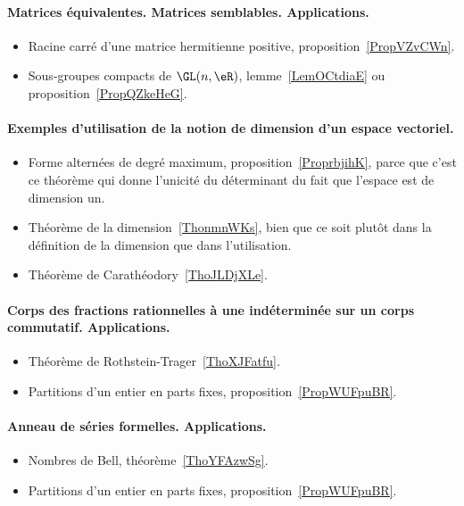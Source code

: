 \paragraph{Matrices équivalentes. Matrices semblables. Applications.}
\begin{itemize}
    \item Racine carré d'une matrice hermitienne positive, proposition~\ref{PropVZvCWn}.
    \item Sous-groupes compacts de \( \GL(n,\eR)\), lemme~\ref{LemOCtdiaE} ou proposition~\ref{PropQZkeHeG}.
\end{itemize}
\paragraph{Exemples d'utilisation de la notion de dimension d'un espace vectoriel.}
\begin{itemize}
    \item Forme alternées de degré maximum, proposition~\ref{ProprbjihK}, parce que c'est ce théorème qui donne l'unicité du déterminant du fait que l'espace est de dimension un.
    \item Théorème de la dimension~\ref{ThonmnWKs}, bien que ce soit plutôt dans la définition de la dimension que dans l'utilisation.
    \item Théorème de Carathéodory~\ref{ThoJLDjXLe}.
\end{itemize}

\paragraph{Corps des fractions rationnelles à une indéterminée sur un corps commutatif. Applications.}
\begin{itemize}
    \item Théorème de Rothstein-Trager~\ref{ThoXJFatfu}.
    \item Partitions d'un entier en parts fixes, proposition~\ref{PropWUFpuBR}.
\end{itemize}

\paragraph{Anneau de séries formelles. Applications.}
\begin{itemize}
    \item Nombres de Bell, théorème~\ref{ThoYFAzwSg}.
    \item Partitions d'un entier en parts fixes, proposition~\ref{PropWUFpuBR}.
\end{itemize}
